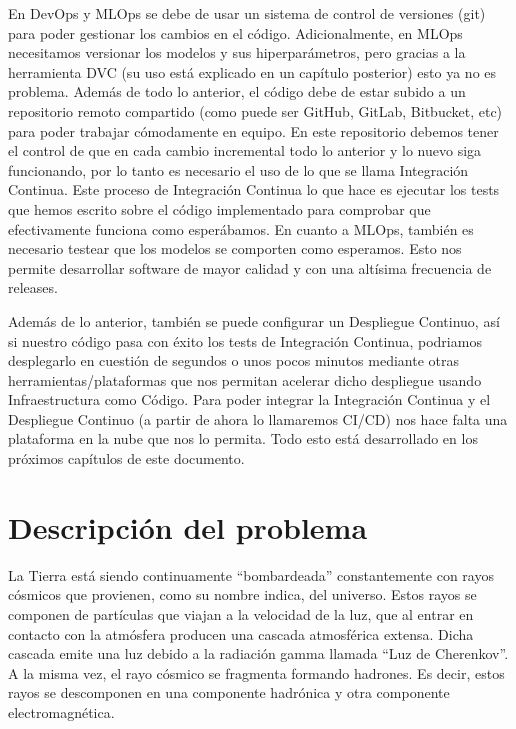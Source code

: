 En DevOps y MLOps se debe de usar un sistema de control de versiones (git) para poder gestionar los cambios en el código. Adicionalmente, en MLOps necesitamos versionar los modelos y sus hiperparámetros, pero gracias a la herramienta DVC (su uso está explicado en un capítulo posterior) esto ya no es problema. Además de todo lo anterior, el código debe de estar subido a un repositorio remoto compartido (como puede ser GitHub, GitLab, Bitbucket, etc) para poder trabajar cómodamente en equipo. En este repositorio debemos tener el control de que en cada cambio incremental todo lo anterior y lo nuevo siga funcionando, por lo tanto es necesario el uso de lo que se llama Integración Continua. Este proceso de Integración Continua lo que hace es ejecutar los tests que hemos escrito sobre el código implementado para comprobar que efectivamente funciona como esperábamos. En cuanto a MLOps, también es necesario testear que los modelos se comporten como esperamos. Esto nos permite desarrollar software de mayor calidad y con una altísima frecuencia de releases.\newline

Además de lo anterior, también se puede configurar un Despliegue Continuo, así si nuestro código pasa con éxito los tests de Integración Continua, podriamos desplegarlo en cuestión de segundos o unos pocos minutos mediante otras herramientas/plataformas que nos permitan acelerar dicho despliegue usando Infraestructura como Código. Para poder integrar la Integración Continua y el Despliegue Continuo (a partir de ahora lo llamaremos CI/CD) nos hace falta una plataforma en la nube que nos lo permita. Todo esto está desarrollado en los próximos capítulos de este documento.

\section{Descripción del problema}

La Tierra está siendo continuamente \enquote{bombardeada} constantemente con rayos cósmicos que provienen, como su nombre indica, del universo. Estos rayos se componen de partículas que viajan a la velocidad de la luz, que al entrar en contacto con la atmósfera producen una cascada atmosférica extensa. Dicha cascada emite una luz debido a la radiación gamma llamada \enquote{Luz de Cherenkov}. A la misma vez, el rayo cósmico se fragmenta formando hadrones. Es decir, estos rayos se descomponen en una componente hadrónica y otra componente electromagnética.\newline

